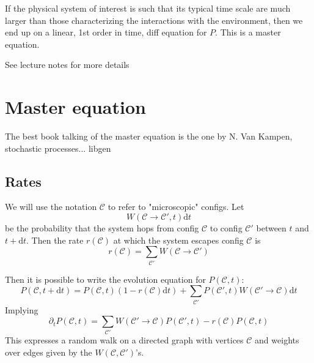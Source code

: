 \documentclass[a4paper]{book}
\theoremstyle{definition}
\theoremstyle{remark}
\begin{document}
If the physical system of interest is such that its typical time scale are much larger than those characterizing the interactions with the environment, then we end up on a linear, 1st order in time, diff equation for $P$. This is a master equation. \par \medskip 

See lecture notes for more details 

\section{Master equation}

The best book talking of the master equation is the one by N. Van Kampen, stochastic processes... libgen

\subsection{Rates}

We will use the notation $\mathscr{C}$ to refer to "microscopic" configs. Let 
\begin{equation}
    W(\mathscr{C} \rightarrow \mathscr{C}', t)\text{d}t
\end{equation}
be the probability that the system hops from config $\mathscr{C}$ to config $\mathscr{C}'$ between $t$ and $t+\text{d}t$. Then the rate $r(\mathscr{C})$ at which the system escapes config $\mathscr{C}$ is 
\begin{equation}
    r(\mathscr{C}) = \sum_{\mathscr{C}'}W(\mathscr{C}\rightarrow\mathscr{C}')
\end{equation}

Then it is possible to write the evolution equation for $P(\mathscr{C}, t)$: 
\begin{equation}
    P(\mathscr{C}, t+\text{d}t) = P(\mathscr{C}, t)(1- r(\mathscr{C})\text{d}t) + \sum_{\mathscr{C}'}P(\mathscr{C}', t)W(\mathscr{C}'\rightarrow\mathscr{C})\text{d}t
\end{equation}
Implying 
\begin{equation}
    \partial_t P(\mathscr{C}, t) = \sum_{\mathscr{C}'}W(\mathscr{C}'\rightarrow\mathscr{C})P(\mathscr{C}', t) - r(\mathscr{C})P(\mathscr{C}, t)
\end{equation}
This expresses a random walk on a directed graph with vertices $\mathscr{C}$ and weights over edges given by the $W(\mathscr{C}, \mathscr{C}')$'s. 
\end{document}
